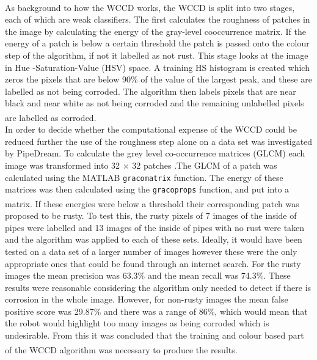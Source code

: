 \documentclass[11pt]{article}		%
\newcommand{\supercite}[1]{\textsuperscript{\cite{#1}}}		%
\begin{document}
        \\
        \hspace*{2ex}As background to how the WCCD works, the WCCD is split into two stages, each of which are weak classifiers. The first calculates the roughness of patches in the image by calculating the energy of the gray-level cooccurrence matrix. If the energy of a patch is below a certain threshold the patch is passed onto the colour step of the algorithm, if not it labelled as not rust. This stage looks at the image in Hue -Saturation-Value (HSV) space. A training HS histogram is created which zeros the pixels that are below 90\% of the value of the largest peak, and these are labelled as not being corroded. The algorithm then labels pixels that are near black and near white as not being corroded and the remaining unlabelled pixels are labelled as corroded\supercite{WCCD}.
        \\
        \hspace*{2ex}In order to decide whether the computational expense of the WCCD could be reduced further the use of the roughness step alone on a data set was investigated by PipeDream. To calculate the grey level co-occurrence matrices (GLCM) each image was transformed into 32 $\times$ 32 patches .The GLCM of a patch was calculated using the MATLAB \verb|gracomatrix| function. The energy of these matrices was then calculated using the \verb|gracoprops| function, and put into a matrix. If these energies were below a threshold\supercite{WCCD} their corresponding patch was proposed to be rusty. To test this, the rusty pixels of 7 images of the inside of pipes were labelled and 13 images of the inside of pipes with no rust were taken and the algorithm was applied to each of these sets. Ideally, it would have been tested on a data set of a larger number of images however these were the only appropriate ones that could be found through an internet search. For the rusty images the mean precision was 63.3\% and the mean recall was 74.3\%. These results were reasonable considering the algorithm only needed to detect if there is corrosion in the whole image. However, for non-rusty images the mean false positive score was 29.87\% and there was a range of 86\%, which would mean that the robot would highlight too many images as being corroded which is undesirable. From this it was concluded that the training and colour based part of the WCCD algorithm was necessary to produce the results\supercite{WCCD}.
\end{document}
